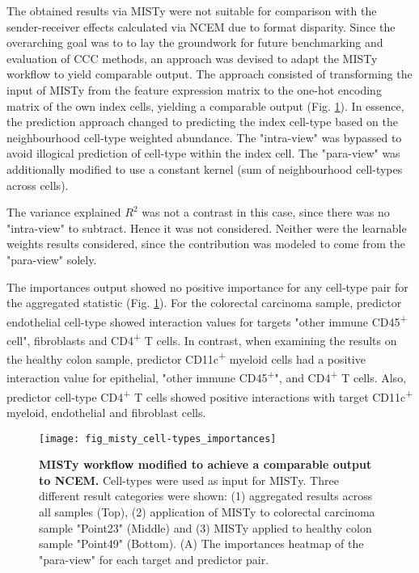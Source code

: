 \pagebreak


The obtained results via MISTy were not suitable for comparison with the sender-receiver effects calculated via NCEM due to format disparity. Since the overarching goal was to to lay the groundwork for future benchmarking and evaluation of CCC methods, an approach was devised to adapt the MISTy workflow to yield comparable output. The approach consisted of transforming the input of MISTy from the feature expression matrix to the one-hot encoding matrix of the own index cells, yielding a comparable output (Fig. \ref{fig:misty_cell-types}). In essence, the prediction approach changed to predicting the index cell-type based on the neighbourhood cell-type weighted abundance. The "intra-view" was bypassed to avoid illogical prediction of cell-type within the index cell. The "para-view" was additionally modified to use a constant kernel (sum of neighbourhood cell-types across cells).

The variance explained $R^2$ was not a contrast in this case, since there was no "intra-view" to subtract. Hence it was not considered. Neither were the learnable weights results considered, since the contribution was modeled to come from the "para-view" solely.

The importances output showed no positive importance for any cell-type pair for the aggregated statistic (Fig. \ref{fig:misty_cell-types}). For the colorectal carcinoma sample, predictor endothelial cell-type showed interaction values for targets "other immune CD45\textsuperscript{+} cell", fibroblasts and CD4\textsuperscript{+} T cells.  In contrast, when examining the results on the healthy colon sample, predictor CD11c\textsuperscript{+} myeloid cells had a positive interaction value for epithelial, "other immune CD45\textsuperscript{+}", and CD4\textsuperscript{+} T cells. Also, predictor cell-type CD4\textsuperscript{+} T cells showed positive interactions with target CD11c\textsuperscript{+} myeloid, endothelial and fibroblast cells.

\begin{figure}[h!]
    \centering
    \texttt{[image: fig\_misty\_cell-types\_importances]}
    \caption{\textbf{MISTy workflow modified to achieve a comparable output to NCEM.} Cell-types were used as input for MISTy. Three different result categories were shown: (1) aggregated results across all samples (Top), (2) application of MISTy to colorectal carcinoma sample "Point23" (Middle) and (3) MISTy applied to healthy colon sample "Point49" (Bottom). (A) The importances heatmap of the "para-view" for each target and predictor pair.}
    \label{fig:misty_cell-types}
\end{figure}
